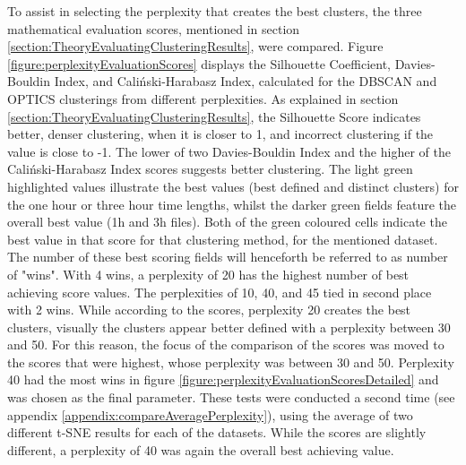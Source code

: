 To assist in selecting the perplexity that creates the best clusters, the three mathematical evaluation scores, mentioned in section \ref{section:TheoryEvaluatingClusteringResults}, were compared. Figure \ref{figure:perplexityEvaluationScores} displays the Silhouette Coefficient, Davies-Bouldin Index, and Caliński-Harabasz Index, calculated for the DBSCAN and OPTICS clusterings from different perplexities. As explained in section \ref{section:TheoryEvaluatingClusteringResults}, the Silhouette Score indicates better, denser clustering, when it is closer to 1, and incorrect clustering if the value is close to -1. The lower of two Davies-Bouldin Index and the higher of the Caliński-Harabasz Index scores suggests better clustering. The light green highlighted values illustrate the best values (best defined and distinct clusters) for the one hour or three hour time lengths, whilst the darker green fields feature the overall best value (1h and 3h files). Both of the green coloured cells indicate the best value in that score for that clustering method, for the mentioned dataset. The number of these best scoring fields will henceforth be referred to as number of "wins". With 4 wins, a perplexity of 20 has the highest number of best achieving score values. The perplexities of 10, 40, and 45 tied in second place with 2 wins. While according to the scores, perplexity 20 creates the best clusters, visually the clusters appear better defined with a perplexity between 30 and 50.  For this reason, the focus of the comparison of the scores was moved to the scores that were highest, whose perplexity was between 30 and 50. Perplexity 40 had the most wins in figure \ref{figure:perplexityEvaluationScoresDetailed} and was chosen as the final parameter. These tests were conducted a second time (see appendix \ref{appendix:compareAveragePerplexity}), using the average of two different t-SNE results for each of the datasets. While the scores are slightly different, a perplexity of 40 was again the overall best achieving value.

